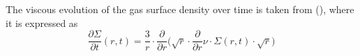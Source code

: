     The viscous
    evolution of the gas surface density over time is taken from
    \citeauthor{Lynden_Bell_1974} (\citeyear{Lynden_Bell_1974}), where it is 
    expressed as
    \begin{equation}
      \frac{\partial\Sigma}{\partial t}(r,t)=
      \frac{3}{r}\cdot\frac{\partial}{\partial r}
      \bigg(\sqrt{r}\cdot\frac{\partial}{\partial r}
      \nu\cdot\Sigma(r,t)\cdot\sqrt{r}\bigg)
      \label{eq:viscous_evolution}
    \end{equation} \ \\
    \\
    \\
